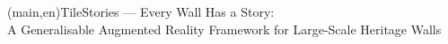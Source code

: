 
%




%
%
%
%
\nttitle(main,en){TileStories — Every Wall Has a Story:\\A Generalisable Augmented Reality Framework for Large-Scale Heritage Walls}%




